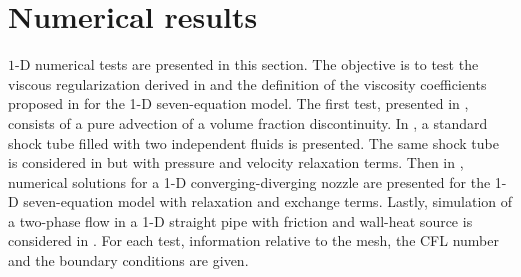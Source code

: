 \section{Numerical results}\label{sec:1d-num-res-sect4}
$1$-D numerical tests are presented in this section. The objective is to test the viscous regularization derived in  and the definition of the viscosity coefficients proposed in  for the 1-D seven-equation model. The first test, presented in ,  consists of a pure advection of a volume fraction discontinuity. In , a standard shock tube filled with two independent fluids is presented. The same shock tube is considered in  but with pressure and velocity relaxation terms. Then in , numerical solutions for a 1-D converging-diverging nozzle are presented for the 1-D seven-equation model with relaxation and exchange terms. Lastly, simulation of a two-phase flow in a 1-D straight pipe with friction and wall-heat source is considered in . For each test, information relative to the mesh, the CFL number and the boundary conditions are given.
